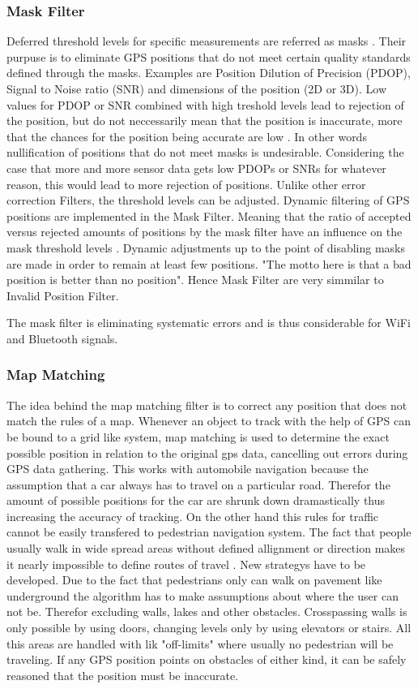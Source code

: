 \subsubsection{Mask Filter} 
Deferred threshold levels for specific measurements are referred as masks \parencite{mapCraft}. Their purpuse is to eliminate GPS positions that do not meet certain quality standards defined through the masks. Examples are Position Dilution of Precision (PDOP), Signal to Noise ratio (SNR) and dimensions of the position (2D or 3D). Low values for PDOP or SNR combined with high treshold levels lead to rejection of the position, but do not neccessarily mean that the position is inaccurate, more that the chances for the position being accurate are low \parencite{mapCraft}. In other words nullification of positions that do not meet masks is undesirable. Considering the case that more and more sensor data gets low PDOPs or SNRs for whatever reason, this would lead to more rejection of positions. Unlike other error correction Filters, the threshold levels can be adjusted. Dynamic filtering of GPS positions are implemented in the Mask Filter. Meaning that the ratio of accepted versus rejected amounts of positions by the mask filter have an influence on the mask threshold levels \parencite{mapCraft}. Dynamic adjustments up to the point of disabling masks are made in order to remain at least few positions. "The motto here is that a bad position is better than no position"\parencite{mapCraft}. Hence Mask Filter are very simmilar to Invalid Position Filter.

The mask filter is eliminating systematic errors and is thus considerable for WiFi and Bluetooth signals.


\subsubsection{Map Matching}
The idea behind the map matching filter is to correct any position that does not match the rules of a map. Whenever an object to track with the help of GPS can be bound to a grid like system, map matching is used to determine the exact possible position in relation to the original gps data, cancelling out errors during GPS data gathering. This works with automobile navigation because the assumption that a car always has to travel on a particular road. Therefor the amount of possible positions for the car are shrunk down dramastically thus increasing the accuracy of tracking. On the other hand this rules for traffic cannot be easily transfered to pedestrian navigation system. The fact that people usually walk in wide spread areas without defined allignment or direction makes it nearly impossible to define routes of travel \parencite{mapCraft}. New strategys have to be developed. Due to the fact that pedestrians only can walk on pavement like underground the algorithm has to make assumptions about where the user can not be. Therefor excluding walls, lakes and other obstacles. Crosspassing walls is only possible by using doors, changing levels only by using elevators or stairs. All this areas are handled with lik "off-limits" where usually no pedestrian will be traveling. If any GPS position points on obstacles of either kind, it can be safely reasoned that the position must be inaccurate.

